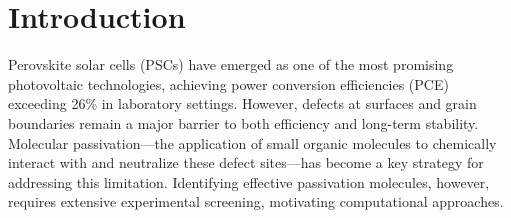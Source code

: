 \documentclass[11pt,a4paper]{article}
\begin{document}
\begin{abstract}
To address this, we implemented a complete SELFIES-based pipeline, replacing SMILES with the guaranteed-valid SELFIES molecular representation for all generation phases. The SELFIES pipeline generates 299,370 molecules across three cycles in approximately 3~hours (versus 12+ hours for SMILES), with 24\% validity (versus 0.3\% for SMILES)---an 80$\times$ improvement. Critically, 95.7\% of SELFIES-generated molecules pass the SA~$\leq$~6.0 filter, yielding \textbf{53,732 filtered candidates}---comparable to the paper's 8,076 (which includes two additional xTB-based filters we could not apply). Our 10 final candidates from the SELFIES pipeline share zero overlap with the paper's Rep10, but one paper Rep10 molecule (G7) is found in our 53,732-molecule filtered set. Running our Stage~3 code on the paper's published data exactly reproduces their Rep10, confirming our post-processing is correct.
\end{abstract}

\tableofcontents
\newpage

\section{Introduction}
\label{sec:introduction}

Perovskite solar cells (PSCs) have emerged as one of the most promising photovoltaic technologies, achieving power conversion efficiencies (PCE) exceeding 26\% in laboratory settings. However, defects at surfaces and grain boundaries remain a major barrier to both efficiency and long-term stability. Molecular passivation---the application of small organic molecules to chemically interact with and neutralize these defect sites---has become a key strategy for addressing this limitation. Identifying effective passivation molecules, however, requires extensive experimental screening, motivating computational approaches.
\end{document}
